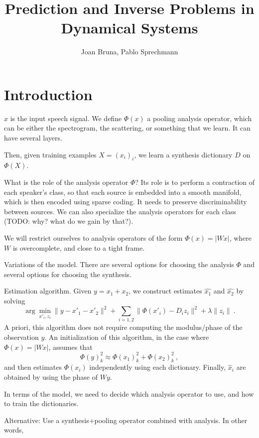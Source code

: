 \documentclass[11pt]{article} %
\title{Prediction and Inverse Problems in Dynamical Systems}
\author{Joan Bruna, Pablo Sprechmann}
\begin{document}
\maketitle


\section{Introduction}


$x$ is the input speech signal. 
We define $\Phi(x)$ a pooling analysis operator, which can be
either the spectrogram, the scattering, or something that we learn. 
It can have several layers. 

Then, given training examples $X=(x_i)_i$, we learn a synthesis dictionary $D$
on $\Phi(X)$. 


What is the role of the analysis operator $\Phi$? 
Its role is to perform a contraction of each speaker's class, so that each source 
is embedded into a smooth manifold, which is then encoded using sparse coding. 
 It needs to preserve discriminability between sources. 
We can also specialize the analysis operators for each class (TODO: why? what do we gain 
by that?). 

We will restrict ourselves to analysis operators of the form 
$\Phi(x) = | W x |$, where $W$ is overcomplete, and close to a tight frame.

Variations of the model. There are several options for choosing the analysis $\Phi$ 
and several options for choosing the synthesis. 



Estimation algorithm. 
Given $y=x_1 +  x_2$, we construct estimates $\hat{x_1}$ and $\hat{x_2}$ 
by solving
\begin{equation}
\label{estalgo}
\arg\min_{x'_i, z_i} \| y - x'_1 - x'_2 \|^2 + \sum_{i=1,2} \| \Phi(x'_i) - D_i z_i \|^2 + \lambda \| z_i \|~.
\end{equation}
A priori, this algorithm does not require computing the modulus/phase of the observation $y$. 
An initialization of this algorithm, in the case where $\Phi(x)= | W x |$, assumes that 
$$\Phi(y)_k^2 \approx \Phi(x_1)_k^2 + \Phi(x_2)_k^2~,$$
and then estimates $\Phi(x_i)$ independently using each dictionary. Finally, $\hat{x}_i$ are obtained
by using the phase of $Wy$.

In terms of the model, we need to decide which analysis operator to use, and 
how to train the dictionaries. 

Alternative: Use a synthesis+pooling operator combined with analysis. In other words, 
\end{document}
